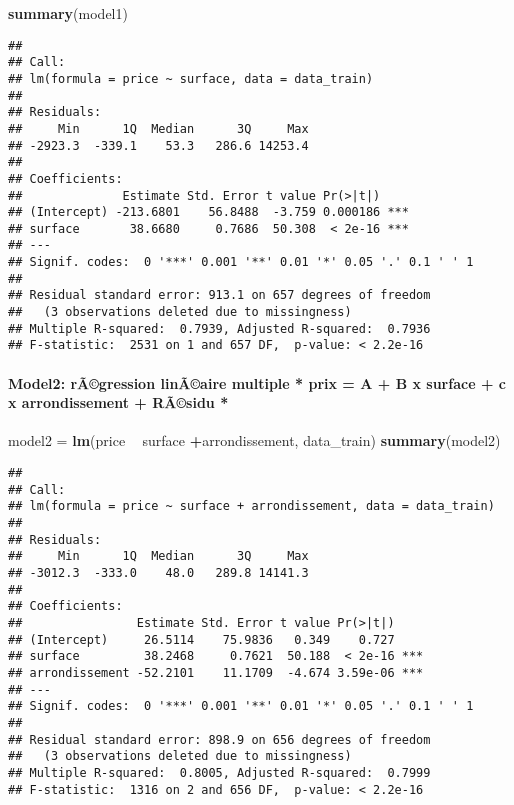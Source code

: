 \documentclass[]{article}
\newenvironment{Shaded}{\begin{snugshade}}{\end{snugshade}}
\newcommand{\KeywordTok}[1]{\textcolor[rgb]{0.13,0.29,0.53}{\textbf{#1}}}
\newcommand{\StringTok}[1]{\textcolor[rgb]{0.31,0.60,0.02}{#1}}
\newcommand{\OperatorTok}[1]{\textcolor[rgb]{0.81,0.36,0.00}{\textbf{#1}}}
\newcommand{\NormalTok}[1]{#1}
\let\oldparagraph\paragraph
\renewcommand{\paragraph}[1]{\oldparagraph{#1}\mbox{}}
\begin{document}
\begin{Shaded}
\begin{Highlighting}[]
\KeywordTok{summary}\NormalTok{(model1)}
\end{Highlighting}
\end{Shaded}

\begin{verbatim}
## 
## Call:
## lm(formula = price ~ surface, data = data_train)
## 
## Residuals:
##     Min      1Q  Median      3Q     Max 
## -2923.3  -339.1    53.3   286.6 14253.4 
## 
## Coefficients:
##              Estimate Std. Error t value Pr(>|t|)    
## (Intercept) -213.6801    56.8488  -3.759 0.000186 ***
## surface       38.6680     0.7686  50.308  < 2e-16 ***
## ---
## Signif. codes:  0 '***' 0.001 '**' 0.01 '*' 0.05 '.' 0.1 ' ' 1
## 
## Residual standard error: 913.1 on 657 degrees of freedom
##   (3 observations deleted due to missingness)
## Multiple R-squared:  0.7939, Adjusted R-squared:  0.7936 
## F-statistic:  2531 on 1 and 657 DF,  p-value: < 2.2e-16
\end{verbatim}

\paragraph{Model2: rÃ©gression linÃ©aire multiple * prix = A + B x
surface + c x arrondissement + RÃ©sidu
*}\label{model2-ragression-linaaire-multiple-prix-a-b-x-surface-c-x-arrondissement-rasidu}

\begin{Shaded}
\begin{Highlighting}[]
\NormalTok{model2 =}\StringTok{ }\KeywordTok{lm}\NormalTok{(price }\OperatorTok{~}\StringTok{ }\NormalTok{surface }\OperatorTok{+}\NormalTok{arrondissement, data_train)}
\KeywordTok{summary}\NormalTok{(model2)}
\end{Highlighting}
\end{Shaded}

\begin{verbatim}
## 
## Call:
## lm(formula = price ~ surface + arrondissement, data = data_train)
## 
## Residuals:
##     Min      1Q  Median      3Q     Max 
## -3012.3  -333.0    48.0   289.8 14141.3 
## 
## Coefficients:
##                Estimate Std. Error t value Pr(>|t|)    
## (Intercept)     26.5114    75.9836   0.349    0.727    
## surface         38.2468     0.7621  50.188  < 2e-16 ***
## arrondissement -52.2101    11.1709  -4.674 3.59e-06 ***
## ---
## Signif. codes:  0 '***' 0.001 '**' 0.01 '*' 0.05 '.' 0.1 ' ' 1
## 
## Residual standard error: 898.9 on 656 degrees of freedom
##   (3 observations deleted due to missingness)
## Multiple R-squared:  0.8005, Adjusted R-squared:  0.7999 
## F-statistic:  1316 on 2 and 656 DF,  p-value: < 2.2e-16
\end{verbatim}
\end{document}

